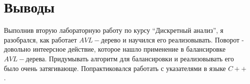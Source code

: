\section{Выводы}
Выполнив вторую лабораторную работу по курсу \enquote{Дискретный анализ}, я разобрался, как работает $AVL-$дерево и научился его реализовывать. Поворот - довольно интеерсное действие, которое нашло применение в балансировке $AVL-$дерева. Придумывать алгоритм для балансировки и реализовывать его было очень затягивающе. Попрактиковался работать с указателями в языке $C++$.
\pagebreak
